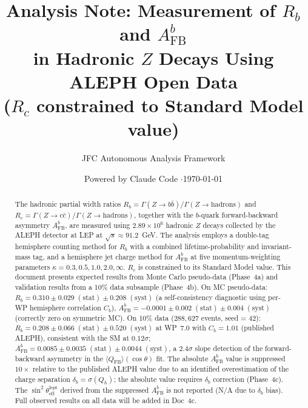 \documentclass[11pt,a4paper]{article}
\title{Analysis Note: Measurement of $R_b$ and $A_\mathrm{FB}^b$\\
in Hadronic $Z$ Decays Using ALEPH Open Data\\
{\normalsize ($R_c$ constrained to Standard Model value)}}
\author{JFC Autonomous Analysis Framework}
\date{Powered by Claude Code \quad$\cdot$\quad \today}
\begin{document}
\maketitle

\begin{abstract}
The hadronic partial width ratios $R_b = \Gamma(Z \to b\bar{b})/\Gamma(Z \to \mathrm{hadrons})$
and $R_c = \Gamma(Z \to c\bar{c})/\Gamma(Z \to \mathrm{hadrons})$, together with the
$b$-quark forward-backward asymmetry $A_\mathrm{FB}^b$, are measured using $2.89 \times 10^6$
hadronic $Z$ decays collected by the ALEPH detector at LEP at $\sqrt{s} \approx 91.2$~GeV.
The analysis employs a double-tag hemisphere counting method for $R_b$ with a combined
lifetime-probability and invariant-mass tag, and a hemisphere jet charge method for
$A_\mathrm{FB}^b$ at five momentum-weighting parameters $\kappa = 0.3, 0.5, 1.0, 2.0, \infty$.
$R_c$ is constrained to its Standard Model value.
This document presents expected results from Monte Carlo pseudo-data (Phase~4a)
and validation results from a 10\% data subsample (Phase~4b).
On MC pseudo-data:
$R_b = 0.310 \pm 0.029\;\mathrm{(stat)} \pm 0.208\;\mathrm{(syst)}$
(a self-consistency diagnostic using per-WP hemisphere correlation $C_b$),
$A_\mathrm{FB}^b = -0.0001 \pm 0.002\;\mathrm{(stat)} \pm 0.004\;\mathrm{(syst)}$
(correctly zero on symmetric MC).
On 10\% data ($288{,}627$ events, seed = 42):
$R_b = 0.208 \pm 0.066\;\mathrm{(stat)} \pm 0.520\;\mathrm{(syst)}$
at WP~7.0 with $C_b = 1.01$ (published ALEPH), consistent with the SM at $0.12\sigma$;
$A_\mathrm{FB}^b = 0.0085 \pm 0.0035\;\mathrm{(stat)} \pm 0.0044\;\mathrm{(syst)}$,
a $2.4\sigma$ slope detection of the forward-backward asymmetry in the
$\langle Q_\mathrm{FB} \rangle(\cos\theta)$ fit.
The absolute $A_\mathrm{FB}^b$ value is suppressed $10\times$
relative to the published ALEPH value due to an identified overestimation of the
charge separation $\delta_b = \sigma(Q_h)$; the absolute value requires $\delta_b$
correction (Phase~4c). The $\sin^2\theta_\mathrm{eff}^\mathrm{lept}$ derived from
the suppressed $A_\mathrm{FB}^b$ is not reported (N/A due to $\delta_b$ bias).
Full observed results on all data will be added in Doc~4c.
\end{abstract}

\tableofcontents
\clearpage

\end{document}
